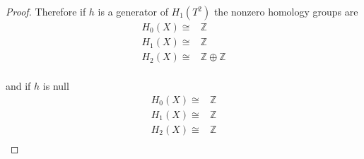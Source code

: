 \documentclass[10pt]{article}
\newcommand{\bb}[1]{\mathbb{#1}}
\theoremstyle{plain}
\theoremstyle{remark}
\begin{document}
\begin{proof}
  Therefore if $h$ is a generator of $H_1(T^2)$ the nonzero homology groups are
  \[
    \begin{array}{cl}
      H_0(X) \cong& \bb{Z}\\
      H_1(X) \cong& \bb{Z}\\
      H_2(X) \cong& \bb{Z}\oplus\bb{Z}\\
    \end{array}
  \]

  and if $h$ is null
  \[
    \begin{array}{cl}
      H_0(X) \cong& \bb{Z}\\
      H_1(X) \cong& \bb{Z}\\
      H_2(X) \cong& \bb{Z}\\
    \end{array}
  \]
\end{proof}


\end{document}
